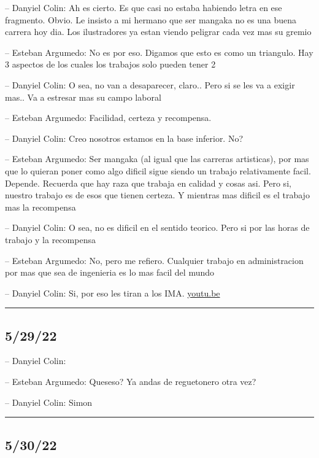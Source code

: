 -- Danyiel Colin: Ah es cierto. Es que casi no estaba habiendo letra en
ese fragmento. Obvio. Le insisto a mi hermano que ser mangaka no es una
buena carrera hoy dia. Los ilustradores ya estan viendo peligrar cada
vez mas su gremio

-- Esteban Argumedo: No es por eso. Digamos que esto es como un
triangulo. Hay 3 aspectos de los cuales los trabajos solo pueden tener 2

-- Danyiel Colin: O sea, no van a desaparecer, claro.. Pero si se les va
a exigir mas.. Va a estresar mas su campo laboral

-- Esteban Argumedo: Facilidad, certeza y recompensa.

-- Danyiel Colin: Creo nosotros estamos en la base inferior. No?

-- Esteban Argumedo: Ser mangaka (al igual que las carreras artisticas),
por mas que lo quieran poner como algo dificil sigue siendo un trabajo
relativamente facil. Depende. Recuerda que hay raza que trabaja en
calidad y cosas asi. Pero si, nuestro trabajo es de esos que tienen
certeza. Y mientras mas dificil es el trabajo mas la recompensa

-- Danyiel Colin: O sea, no es dificil en el sentido teorico. Pero si
por las horas de trabajo y la recompensa

-- Esteban Argumedo: No, pero me refiero. Cualquier trabajo en
administracion por mas que sea de ingenieria es lo mas facil del mundo

-- Danyiel Colin: Si, por eso les tiran a los IMA.
\href{https://youtu.be/O-kgTBdpjZw}{youtu.be}

\begin{center}\rule{0.5\linewidth}{0.5pt}\end{center}

\hypertarget{section-88}{%
\subsection{5/29/22}\label{section-88}}

-- Danyiel Colin:

-- Esteban Argumedo: Queseso? Ya andas de reguetonero otra vez?

-- Danyiel Colin: Simon

\begin{center}\rule{0.5\linewidth}{0.5pt}\end{center}

\hypertarget{section-89}{%
\subsection{5/30/22}\label{section-89}}

